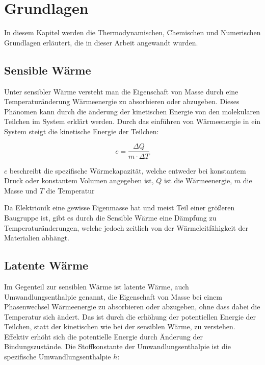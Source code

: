 \chapter{Grundlagen}
\label{chap:Grundlagen}			%

In diesem Kapitel werden die Thermodynamischen, Chemischen und Numerischen Grundlagen erläutert, die in dieser Arbeit angewandt wurden. 

\section{Sensible Wärme}\label{sec:sensiblewaerme}

Unter sensibler Wärme versteht man die Eigenschaft von Masse durch eine Temperaturänderung Wärmeenergie zu absorbieren oder abzugeben. Dieses
Phänomen kann durch die änderung der kinetischen Energie von den molekularen Teilchen im System erklärt werden. Durch das einführen von
Wärmeenergie in ein System steigt die kinetische Energie der Teilchen:

\begin{equation}
    c = \frac{\Delta Q}{m \cdot \Delta T}
\end{equation}

$c$ beschreibt die spezifische Wärmekapazität, welche entweder bei konstantem Druck oder konstantem Volumen angegeben ist,
$Q$ ist die Wärmeenergie, $m$ die Masse und $T$ die Temperatur

Da Elektrionik eine gewisse Eigenmasse hat und meist Teil einer größeren Baugruppe ist, gibt es durch die Sensible Wärme eine Dämpfung
zu Temperaturänderungen, welche jedoch zeitlich von der Wärmeleitfähigkeit der Materialien abhängt.

\section{Latente Wärme}\label{sec:latentewaerme}

Im Gegenteil zur sensiblen Wärme ist latente Wärme, auch Umwandlungsenthalpie genannt, die Eigenschaft von Masse bei einem Phasenwechsel Wärmeenergie
zu absorbieren oder abzugeben, ohne dass dabei die Temperatur sich ändert. Das ist durch die erhöhung der potentiellen Energie der Teilchen,
statt der kinetischen wie bei der sensiblen Wärme, zu verstehen. Effektiv erhöht sich die potentielle Energie durch Änderung der Bindungszustände.
Die Stoffkonstante der Umwandlungsenthalpie ist die spezifische Umwandlungsenthalpie $h$:


